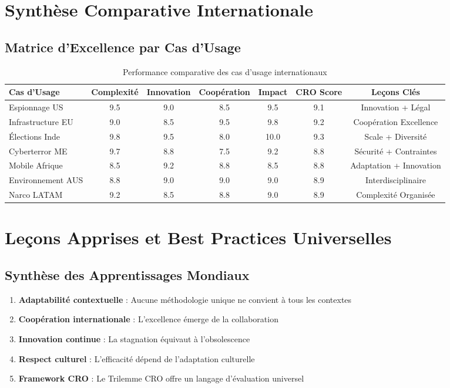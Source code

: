 \section{Synthèse Comparative Internationale}

\subsection{Matrice d'Excellence par Cas d'Usage}

\begin{table}[h]
\centering
\scriptsize
\begin{tabular}{|l|c|c|c|c|c|c|}
\hline
\textbf{Cas d'Usage} & \textbf{Complexité} & \textbf{Innovation} & \textbf{Coopération} & \textbf{Impact} & \textbf{CRO Score} & \textbf{Leçons Clés} \\
\hline
Espionnage US & 9.5 & 9.0 & 8.5 & 9.5 & 9.1 & Innovation + Légal \\
Infrastructure EU & 9.0 & 8.5 & 9.5 & 9.8 & 9.2 & Coopération Excellence \\
Élections Inde & 9.8 & 9.5 & 8.0 & 10.0 & 9.3 & Scale + Diversité \\
Cyberterror ME & 9.7 & 8.8 & 7.5 & 9.2 & 8.8 & Sécurité + Contraintes \\
Mobile Afrique & 8.5 & 9.2 & 8.8 & 8.5 & 8.8 & Adaptation + Innovation \\
Environnement AUS & 8.8 & 9.0 & 9.0 & 9.0 & 8.9 & Interdisciplinaire \\
Narco LATAM & 9.2 & 8.5 & 8.8 & 9.0 & 8.9 & Complexité Organisée \\
\hline
\end{tabular}
\caption{Performance comparative des cas d'usage internationaux}
\end{table}

\section{Leçons Apprises et Best Practices Universelles}

\subsection{Synthèse des Apprentissages Mondiaux}

\begin{enumerate}
\item \textbf{Adaptabilité contextuelle} : Aucune méthodologie unique ne convient à tous les contextes
\item \textbf{Coopération internationale} : L'excellence émerge de la collaboration
\item \textbf{Innovation continue} : La stagnation équivaut à l'obsolescence
\item \textbf{Respect culturel} : L'efficacité dépend de l'adaptation culturelle
\item \textbf{Framework CRO} : Le Trilemme CRO offre un langage d'évaluation universel
\end{enumerate}

